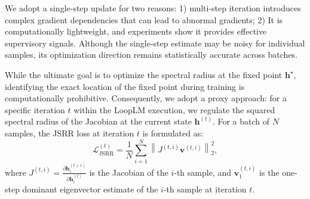 We adopt a single-step update for two reasons: 1) multi-step iteration introduces complex gradient dependencies that can lead to abnormal gradients; 2) It is computationally lightweight, and experiments show it provides effective supervisory signals. Although the single-step estimate may be noisy for individual samples, its optimization direction remains statistically accurate across batches.

While the ultimate goal is to optimize the spectral radius at the fixed point $\mathbf{h}^\star$, identifying the exact location of the fixed point during training is computationally prohibitive. Consequently, we adopt a proxy approach: for a specific iteration $t$ within the LoopLM execution, we regulate the squared spectral radius of the Jacobian at the current state $\mathbf{h}^{(t)}$. For a batch of $N$ samples, the JSRR loss at iteration $t$ is formulated as:
\begin{equation}
\label{e2}
    \mathcal{L}_{\text{JSRR}}^{(t)} 
    = \frac{1}{N} \sum_{i=1}^N 
    \left\|
    J^{(t,i)} \mathbf{v}^{(t,i)}
    \right\|_2^2,
\end{equation}
where $J^{(t,i)} = \frac{\partial \mathbf{h}^{(t+1)}_{i}}{\partial \mathbf{h}^{(t)}_{i}}$ is the Jacobian of the $i$-th sample, and $\mathbf{v}_{1}^{(t,i)}$ is the one-step dominant eigenvector estimate of the $i$-th sample at iteration $t$.

